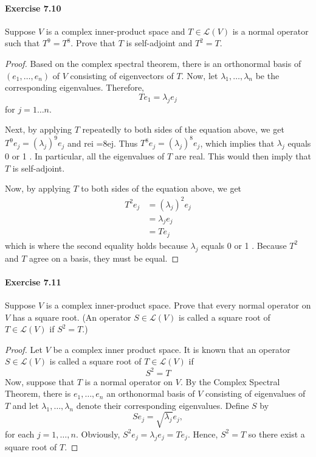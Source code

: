 \documentclass{article}
\theoremstyle{definition}
\begin{document}
\paragraph{Exercise 7.10} Suppose $V$ is a complex inner-product space and $T \in \mathcal{L}(V)$ is a normal operator such that $T^{9}=T^{8}$. Prove that $T$ is self-adjoint and $T^{2}=T$.
\begin{proof}
    Based on the complex spectral theorem, there is an orthonormal basis of $\left(e_1, \ldots, e_n\right)$ of $V$ consisting of eigenvectors of $T$. Now, let $\lambda_1, \ldots, \lambda_n$ be the corresponding eigenvalues. Therefore,
$$
T e_1=\lambda_j e_j
$$
for $j=1 \ldots n$.

Next, by applying $T$ repeatedly to both sides of the equation above, we get $T^9 e_j=\left(\lambda_j\right)^9 e_j$ and rei =8ej. Thus $T^8 e_j=\left(\lambda_j\right)^8 e_j$, which implies that $\lambda_j$ equals 0 or 1 . In particular, all the eigenvalues of $T$ are real. This would then imply that $T$ is self-adjoint.

Now, by applying $T$ to both sides of the equation above, we get
$$
\begin{aligned}
T^2 e_j & =\left(\lambda_j\right)^2 e_j \\
& =\lambda_j e_j \\
& =T e_j
\end{aligned}
$$
which is where the second equality holds because $\lambda_j$ equals 0 or 1 . Because $T^2$ and $T$ agree on a basis, they must be equal.
\end{proof}



\paragraph{Exercise 7.11} Suppose $V$ is a complex inner-product space. Prove that every normal operator on $V$ has a square root. (An operator $S \in \mathcal{L}(V)$ is called a square root of $T \in \mathcal{L}(V)$ if $S^{2}=T$.)
\begin{proof}
    Let $V$ be a complex inner product space.
It is known that an operator $S \in \mathcal{L}(V)$ is called a square root of $T \in \mathcal{L}(V)$ if
$$
S^2=T
$$
Now, suppose that $T$ is a normal operator on $V$.
By the Complex Spectral Theorem, there is $e_1, \ldots, e_n$ an orthonormal basis of $V$ consisting of eigenvalues of $T$ and let $\lambda_1, \ldots, \lambda_n$ denote their corresponding eigenvalues.
Define $S$ by
$$
S e_j=\sqrt{\lambda_j} e_j,
$$
for each $j=1, \ldots, n$.
Obviously, $S^2 e_j=\lambda_j e_j=T e_j$.
Hence, $S^2=T$ so there exist a square root of $T$.
\end{proof}
\end{document}
